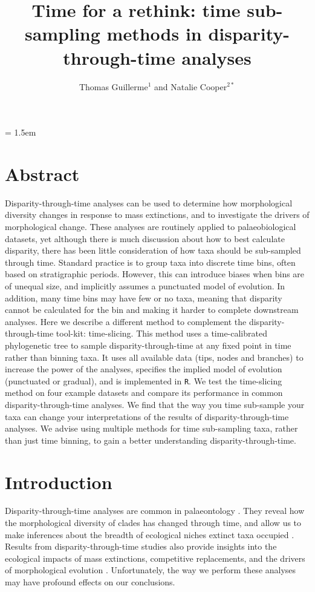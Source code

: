 \documentclass[12pt,a4paper]{article}
\title{Time for a rethink: time sub-sampling methods in disparity-through-time analyses}
\author{
	Thomas Guillerme$^{1}$ and Natalie Cooper$^{2*}$
}
\date{}
\affiliation{\noindent{\footnotesize
	$^1$School of Biological Sciences, University of Queensland, St. Lucia, Queensland, Australia.\\
	$^2$Department of Life Sciences, Natural History Museum, Cromwell Road, London, SW7 5BD, UK. natalie.cooper@nhm.ac.uk}\\
	$^*$Corresponding author\\}
\begin{document}
\mstitlepage
\parindent = 1.5em
\addtolength{\parskip}{.3em}

\section{Abstract}

Disparity-through-time analyses can be used to determine how morphological diversity changes in response to mass extinctions, and to investigate the drivers of morphological change.
These analyses are routinely applied to palaeobiological datasets, yet although there is much discussion about how to best calculate disparity, there has been little consideration of how taxa should be sub-sampled through time.
Standard practice is to group taxa into discrete time bins, often based on stratigraphic periods. 
However, this can introduce biases when bins are of unequal size, and implicitly assumes a punctuated model of evolution. 
In addition, many time bins may have few or no taxa, meaning that disparity cannot be calculated for the bin and making it harder to complete downstream analyses.
Here we describe a different method to complement the disparity-through-time tool-kit: time-slicing.
This method uses a time-calibrated phylogenetic tree to sample disparity-through-time at any fixed point in time rather than binning taxa.
It uses all available data (tips, nodes and branches) to increase the power of the analyses, specifies the implied model of evolution (punctuated or gradual), and is implemented in \texttt{R}.
We test the time-slicing method on four example datasets and compare its performance in common disparity-through-time analyses.
We find that the way you time sub-sample your taxa can change your interpretations of the results of disparity-through-time analyses.
We advise using multiple methods for time sub-sampling taxa, rather than just time binning, to gain a better understanding disparity-through-time.

\newpage
\raggedright
\doublespacing
\setlength{\parindent}{1cm}

\section{Introduction}
Disparity-through-time analyses are common in palaeontology \citep{gould1991disparity,briggs1992morphological,Wills1994,Foote01071994}.
They reveal how the morphological diversity of clades has changed through time, and allow us to make inferences about the breadth of ecological niches extinct taxa occupied \citep{foote1997evolution}.
Results from disparity-through-time studies also provide insights into the ecological impacts of mass extinctions, competitive replacements, and the drivers of morphological evolution \citep{Brusatte12092008,Foote29111996,friedmanexplosive2010}.
Unfortunately, the way we perform these analyses may have profound effects on our conclusions.
\end{document}
